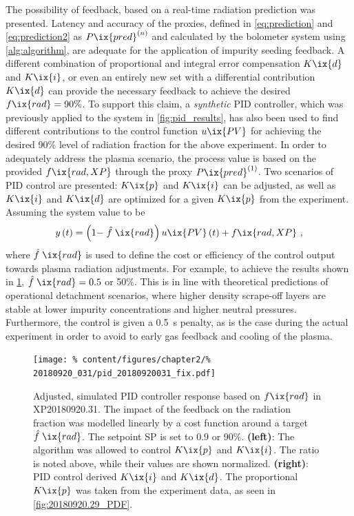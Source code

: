             The possibility of feedback, based on a real-time radiation prediction was presented. Latency and accuracy of the proxies, defined in \cref{eq:prediction} and \cref{eq:prediction2} as $P\ix{pred}^{\left(n\right)}$ and calculated by the bolometer system using \autoref{alg:algorithm}, are adequate for the application of impurity seeding feedback. A different combination of proportional and integral error compensation $K\ix{d}$ and $K\ix{i}$, or even an entirely new set with a differential contribution $K\ix{d}$ can provide the necessary feedback to achieve the desired $f\ix{rad}=90\%$. To support this claim, a \textit{synthetic} PID controller, which was previously applied to the system in \cref{fig:pid_results}, has also been used to find different contributions to the control function $u\ix{PV}$ for achieving the desired 90\% level of radiation fraction for the above experiment. In order to adequately address the plasma scenario, the process value is based on the provided $f\ix{rad,XP}$ through the proxy $P\ix{pred}^{\left(1\right)}$. Two scenarios of PID control are presented: $K\ix{p}$ and $K\ix{i}$ can be adjusted, as well as $K\ix{i}$ and $K\ix{d}$ are optimized for a given $K\ix{p}$ from the experiment. Assuming the system value to be%
%
            \begin{align}%
                y\left(t\right)=\left(1-\mathrel{\hat{f}}\ix{rad}\right)u\ix{PV}\left(t\right)+f\ix{rad,XP}\,\,,\nonumber%
            \end{align}%
%
            where $\mathrel{\hat{f}}\ix{rad}$ is used to define the cost or efficiency of the control output towards plasma radiation adjustments. For example, to achieve the results shown in \cref{fig:20180920.31_PID}, $\mathrel{\hat{f}}\ix{rad}=0.5$ or 50\%. This is in line with theoretical predictions of operational detachment scenarios, where higher density scrape-off layers are stable at lower impurity concentrations and higher neutral pressures. Furthermore, the control is given a \SI{0.5}{\second} penalty, as is the case during the actual experiment in order to avoid to early gas feedback and cooling of the plasma.\\%
%
            \begin{figure}[t]%
                \centering%
                \texttt{[image: \%
                    content/figures/chapter2/\%
                    20180920\_031/pid\_20180920031\_fix.pdf]}%
                \caption{Adjusted, simulated PID controller response based on $f\ix{rad}$ in XP20180920.31. The impact of the feedback on the radiation fraction was modelled linearly by a cost function around a target $\mathrel{\hat{f}}\ix{rad}$. The setpoint SP is set to 0.9 or 90\%. \textbf{(left)}: The algorithm was allowed to control $K\ix{p}$ and $K\ix{i}$. The ratio is noted above, while their values are shown normalized. \textbf{(right)}: PID control derived $K\ix{i}$ and $K\ix{d}$. The proportional $K\ix{p}$ was taken from the experiment data, as seen in \cref{fig:20180920.29_PDF}.}\label{fig:20180920.31_PID}%
            \end{figure}%

